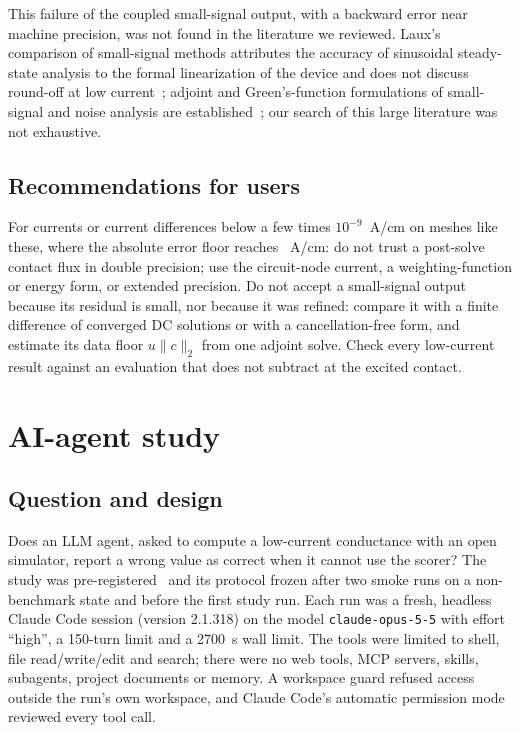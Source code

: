 \documentclass[11pt]{article}
\begin{document}
This failure of the coupled small-signal output, with a backward error near machine precision, was not found in the
literature we reviewed. Laux's comparison of small-signal methods attributes the accuracy of sinusoidal steady-state
analysis to the formal linearization of the device and does not discuss round-off at low current~\cite{Laux1985}; adjoint and
Green's-function formulations of small-signal and noise analysis are established~\cite{GhioneFilicori1993,Bonani2003};
our search of this large literature was not exhaustive.


\subsection{Recommendations for users}
For currents or current differences below a few times $10^{-9}$~A/cm on meshes like these, where the absolute error
floor reaches \floorMax{}~A/cm: do not trust a post-solve contact flux in double precision; use the circuit-node current, a weighting-function or energy form, or extended precision. Do not accept a
small-signal output because its residual is small, nor because it was refined: compare it with a finite difference of
converged DC solutions or with a cancellation-free form, and estimate its data floor $u\|c\|_2$ from one adjoint solve. Check every low-current result against an evaluation that does not subtract at the
excited contact.

\section{AI-agent study}\label{sec:agents}

\subsection{Question and design}
Does an LLM agent, asked to compute a low-current conductance with an open simulator, report a wrong value as correct
when it cannot use the scorer? The study was pre-registered~\cite{Nosek2018} and its protocol frozen after two smoke runs
on a non-benchmark state and before the first study run. Each run was a fresh, headless Claude Code session (version
2.1.318) on the model \texttt{claude-opus-5-5} with effort ``high'', a 150-turn limit and a 2700~s wall limit. The tools
were limited to shell, file read/write/edit and search; there were no web tools, MCP servers, skills, subagents, project
documents or memory. A workspace guard refused access outside the run's own workspace, and Claude Code's automatic
permission mode reviewed every tool call.
\end{document}
